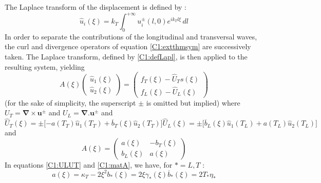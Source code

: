 The Laplace transform of the displacement is defined by :
\begin{equation}
\hat{u}_i(\xi)=k_T\int_0^{+\infty}u_i^\pm(l,0)e^{ik_Tl\xi}\, dl
\label{C1:defLapl}
\end{equation}
In order to separate the contributions of the longitudinal and transversal waves, the curl and divergence operators of equation \eqref{C1:extthmsym} are successively taken. The Laplace transform, defined by \eqref{C1:defLapl}, is then applied to the resulting system, yielding
\begin{equation}
A(\xi)\begin{pmatrix}
\hat{u}_1(\xi)\\
\hat{u}_2(\xi)
\end{pmatrix}
= \begin{pmatrix}
f_T(\xi)-\hat{U}_Ts(\xi)\\
f_L(\xi)-\hat{U}_L(\xi)
\end{pmatrix}
\label{C1:LTsyst}
\end{equation}
(for the sake of simplicity, the superscript $\pm$ is omitted but implied) where $U_T=\mathbf{\nabla}\times\mathbf{u}^\pm$ and $U_L=\mathbf{\nabla}.\mathbf{u}^\pm$ and 
\begin{subequations}
\begin{equation}
\hat{U}_T(\xi)=\pm\lbrack -a(T_T)\hat{u}_1(T_T)+\overline{b}_T(\xi)\hat{u}_2(T_T) \rbrack
\end{equation}
\begin{equation}
\hat{U}_L(\xi)=\pm\lbrack \overline{b}_L(\xi)\hat{u}_1(T_L)+a(T_L)\hat{u}_2(T_L) \rbrack
\end{equation}
\label{C1:ULUT}
\end{subequations}
and
\begin{equation}
A(\xi)=\begin{pmatrix}
a(\xi)&-b_T(\xi)\\
b_L(\xi)&a(\xi)
\end{pmatrix}
\label{C1:matA}
\end{equation}
In equations \eqref{C1:ULUT} and \eqref{C1:matA}, we have, for $*=L,T$ :
\begin{subequations}
\begin{equation}
a(\xi)=\kappa_T-2\xi^2
\end{equation}
\begin{equation}
b_*(\xi)=2\xi\gamma_*(\xi)
\end{equation}
\begin{equation}
\overline{b}_*(\xi)=2T_*\eta_*
\end{equation}
\end{subequations}
